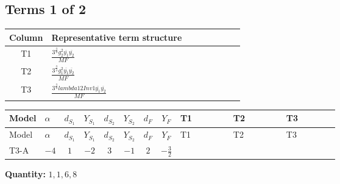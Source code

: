 \documentclass[8pt]{article}
\begin{document}
\begin{landscape}
\subsection*{Terms 1 of 2}
\begin{center}
\begin{tabular}{@{}c >{\raggedright\arraybackslash}p{0.82\linewidth}@{}}
\toprule
Column & Representative term structure \\
\midrule
T1 & \(\displaystyle \frac{3^{\frac{3}{4}} g_{2}^{2} \overline{y_{1}} \overline{y_{2}}}{MF}\) \\
\midrule
T2 & \(\displaystyle \frac{3^{\frac{3}{4}} g_{1}^{2} \overline{y_{1}} \overline{y_{2}}}{MF}\) \\
\midrule
T3 & \(\displaystyle \frac{3^{\frac{3}{4}} lambda12Inv1 \overline{y_{1}} \overline{y_{2}}}{MF}\) \\
\midrule
\bottomrule
\end{tabular}
\end{center}
\smallskip
\tiny
\begin{longtable}{@{}llcccccc >{\raggedright\arraybackslash}p{0.21\linewidth} >{\raggedright\arraybackslash}p{0.21\linewidth} >{\raggedright\arraybackslash}p{0.21\linewidth}@{}}
\toprule
Model & $\alpha$ & $d_{S_1}$ & $Y_{S_1}$ & $d_{S_2}$ & $Y_{S_2}$ & $d_F$ & $Y_F$ & T1 & T2 & T3 \\
\midrule
\endfirsthead
\toprule
Model & $\alpha$ & $d_{S_1}$ & $Y_{S_1}$ & $d_{S_2}$ & $Y_{S_2}$ & $d_F$ & $Y_F$ & T1 & T2 & T3 \\
\midrule
\endhead
T3-A & $-4$ & $1$ & $-2$ & $3$ & $-1$ & $2$ & $-\frac{3}{2}$ & \scriptsize\adjustbox{max width=\linewidth}{$\begin{gathered} - \frac{11 \cdot 3^{\frac{3}{4}} g_{2}^{2} \overline{y_{1}} \overline{y_{2}}}{8 MF}\end{gathered}$} & \scriptsize\adjustbox{max width=\linewidth}{$\begin{gathered} - \frac{9 \cdot 3^{\frac{3}{4}} g_{1}^{2} \overline{y_{1}} \overline{y_{2}}}{8 MF}\end{gathered}$} & \scriptsize\adjustbox{max width=\linewidth}{$\begin{gathered} - \frac{3^{\frac{3}{4}} lambda12Inv1 \overline{y_{1}} \overline{y_{2}}}{6 MF}\end{gathered}$} \\
\midrule
\bottomrule
\end{longtable}
\clearpage
\noindent\textbf{Quantity: }$\mathrm{1,1,6,8}$\par\smallskip

\end{landscape}
\end{document}

